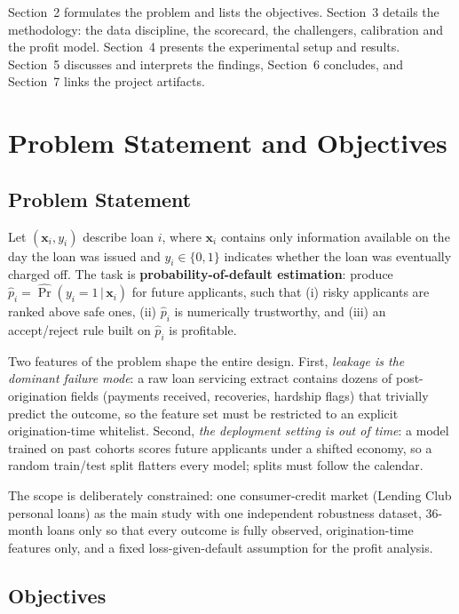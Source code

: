 \documentclass[a4paper,twocolumn,10pt]{article}
\begin{document}
Section~2 formulates the problem and lists the objectives. Section~3 details the methodology: the data discipline, the scorecard, the challengers, calibration and the profit model. Section~4 presents the experimental setup and results. Section~5 discusses and interprets the findings, Section~6 concludes, and Section~7 links the project artifacts.

\section{Problem Statement and Objectives}

\subsection{Problem Statement}

Let $(\mathbf{x}_i, y_i)$ describe loan $i$, where $\mathbf{x}_i$ contains only information available on the day the loan was issued and $y_i \in \{0,1\}$ indicates whether the loan was eventually charged off. The task is \textbf{probability-of-default estimation}: produce $\hat p_i = \widehat{\Pr}(y_i = 1 \,|\, \mathbf{x}_i)$ for future applicants, such that (i) risky applicants are ranked above safe ones, (ii) $\hat p_i$ is numerically trustworthy, and (iii) an accept/reject rule built on $\hat p_i$ is profitable.

Two features of the problem shape the entire design. First, \emph{leakage is the dominant failure mode}: a raw loan servicing extract contains dozens of post-origination fields (payments received, recoveries, hardship flags) that trivially predict the outcome, so the feature set must be restricted to an explicit origination-time whitelist. Second, \emph{the deployment setting is out of time}: a model trained on past cohorts scores future applicants under a shifted economy, so a random train/test split flatters every model; splits must follow the calendar.

The scope is deliberately constrained: one consumer-credit market (Lending Club personal loans) as the main study with one independent robustness dataset, 36-month loans only so that every outcome is fully observed, origination-time features only, and a fixed loss-given-default assumption for the profit analysis.

\subsection{Objectives}
\end{document}
